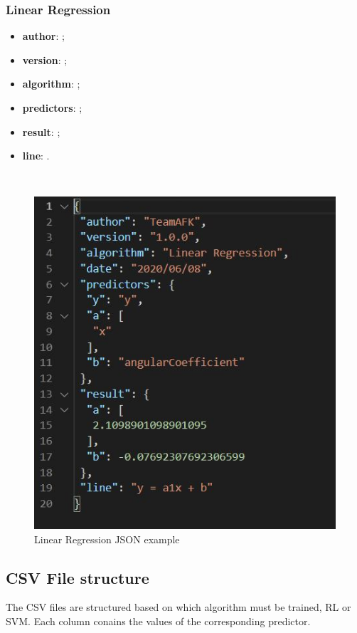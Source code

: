 \subsubsection{Linear Regression}
\begin{itemize}
	\item \textbf{author}: ;
	\item \textbf{version}: ;
	\item \textbf{algorithm}: ;
	\item \textbf{predictors}: ;
	\item \textbf{result}: ;
	\item \textbf{line}: .
\end{itemize}
\hspace{5cm}\\
\begin{figure}[H]
\centering
\includegraphics[scale=0.75]{img/json/jsonRL.jpg}
\caption{Linear Regression JSON example}
\end{figure}

\subsection{CSV File structure}
The CSV files are structured based on which algorithm must be trained, RL or SVM.
Each column conains the values of the corresponding predictor\glo.

